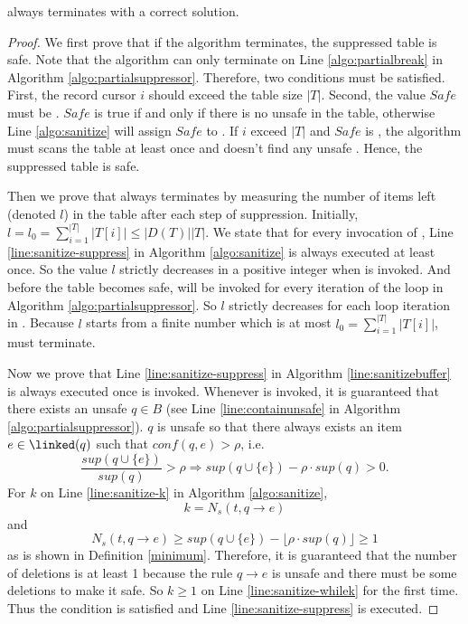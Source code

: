 \begin{theorem}
\label{CorrectnessOfPartialSuppressor}
  \PartialSuppressor always terminates with a correct solution.
\end{theorem}
\begin{proof}
We first prove that if the algorithm terminates, the suppressed table is safe.
Note that the algorithm can only terminate on Line \ref{algo:partialbreak}
  in Algorithm \ref{algo:partialsuppressor}.
  Therefore, two conditions must be satisfied. First, the record cursor 
$i$ should exceed the table size $|T|$. Second, the value $Safe$ must be \TRUE. 
$Safe$ is true if and only if there is no unsafe \qids in the table, otherwise  Line \ref{algo:sanitize}
 will assign $Safe$ to \FALSE. If $i$ exceed $|T|$ and $Safe$ is \TRUE, the algorithm
must scans the table at least once and doesn't find any unsafe \qids. Hence, the
 suppressed table is safe.


Then we prove that \PartialSuppressor always terminates by measuring the
  number of items left (denoted $l$) in the table after each step of suppression.
Initially, $l=l_0=\sum_{i=1}^{|T|} |T[i]|\le |D(T)| |T|$.
We state that for every invocation of \SanitizeBuffer, Line \ref{line:sanitize-suppress}
  in Algorithm \ref{algo:sanitize} is always executed at least once.
So the value $l$ strictly decreases in a positive integer
when \SanitizeBuffer is invoked.
And before the table becomes safe, \SanitizeBuffer will be invoked for
  every iteration of the loop in Algorithm \ref{algo:partialsuppressor}.
So $l$ strictly decreases for each loop iteration in \PartialSuppressor.
Because $l$ starts from a finite number which is at most $l_0=\sum_{i=1}^{|T|} |T[i]|$,
  \PartialSuppressor must terminate.

Now we prove that Line \ref{line:sanitize-suppress} in Algorithm \ref{line:sanitizebuffer}
  is always executed once \SanitizeBuffer is invoked.
Whenever \SanitizeBuffer is invoked, it is guaranteed that there exists
  an unsafe \qid $q\in B$ (see Line \ref{line:containunsafe}  in Algorithm \ref{algo:partialsuppressor}).
$q$ is unsafe so that there always exists an item $e\in\linked(q)$ such that $conf(q,e)>\rho$,
  i.e. \[ \frac{sup(q\cup\{e\})}{sup(q)}>\rho \Rightarrow
   sup(q\cup\{e\})-\rho\cdot sup(q)>0 .\]
For $k$ on Line \ref{line:sanitize-k} in Algorithm \ref{algo:sanitize},
  \[ k = N_s(t, q\rightarrow e)\]
  and
  \[N_s(t, q\rightarrow e) \geq sup(q\cup\{e\})-\lfloor\rho\cdot sup(q)\rfloor \ge 1\]
  as is shown in Definition \ref{minimum}. Therefore,
  it is guaranteed that the number of deletions is at least 1
  because the rule $q\rightarrow e$ is unsafe and there must be some deletions to make it safe.
So $k\ge 1$ on Line \ref{line:sanitize-whilek} for the first time.
Thus the condition is satisfied and Line \ref{line:sanitize-suppress} is executed.
\end{proof}

